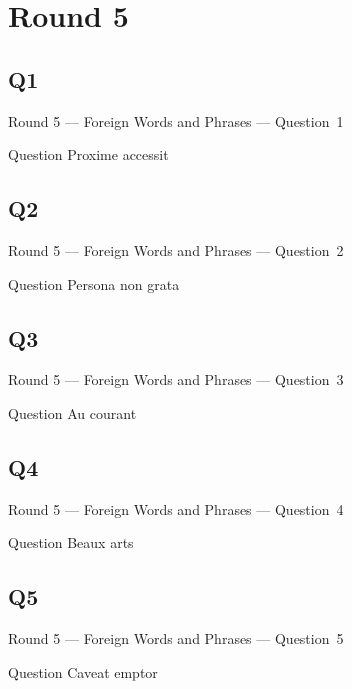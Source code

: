\documentclass[11pt]{beamer}
\begin{document}
\section{Round 5}
\subsection*{Q1}
\begin{frame}[t]{Round 5 --- Foreign Words and Phrases --- \mbox{Question 1}}
\vspace{-0.5em}
\begin{block}{Question}
Proxime accessit
\end{block}
\end{frame}
\subsection*{Q2}
\begin{frame}[t]{Round 5 --- Foreign Words and Phrases --- \mbox{Question 2}}
\vspace{-0.5em}
\begin{block}{Question}
Persona non grata
\end{block}
\end{frame}
\subsection*{Q3}
\begin{frame}[t]{Round 5 --- Foreign Words and Phrases --- \mbox{Question 3}}
\vspace{-0.5em}
\begin{block}{Question}
Au courant
\end{block}
\end{frame}
\subsection*{Q4}
\begin{frame}[t]{Round 5 --- Foreign Words and Phrases --- \mbox{Question 4}}
\vspace{-0.5em}
\begin{block}{Question}
Beaux arts	
\end{block}
\end{frame}
\subsection*{Q5}
\begin{frame}[t]{Round 5 --- Foreign Words and Phrases --- \mbox{Question 5}}
\vspace{-0.5em}
\begin{block}{Question}
Caveat emptor
\end{block}
\end{frame}
\end{document}
